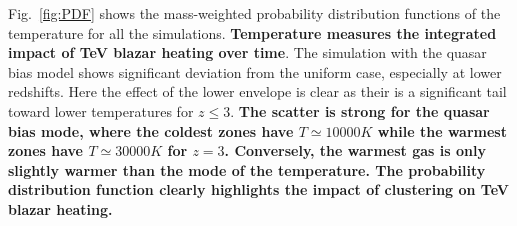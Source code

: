 \documentclass[twocolumns]{emulateapj}
\newcommand\ALc[1]{{\color{red} \bf #1}} %
\begin{document}
{Fig.~\ref{fig:PDF} shows the mass-weighted probability distribution functions of the temperature for all the simulations. \ALc{Temperature measures the integrated impact of TeV blazar heating over time}. The simulation with the quasar bias model shows significant deviation from the uniform case, especially at lower redshifts. Here the effect of the lower envelope is clear as their is a significant tail toward lower temperatures for $z \leqslant 3$. \ALc{The scatter is strong for the quasar bias mode, where the coldest zones have $T\simeq 10 000K$ while the warmest zones have $T\simeq 30 000K$ for $z=3$. Conversely, the warmest gas is only slightly warmer than the mode of the temperature. The probability distribution function clearly highlights the impact of clustering on TeV blazar heating.}



}
\end{document}

